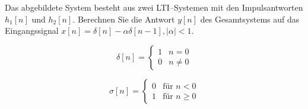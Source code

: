 \begin{uebsp}
\begin{Exercise}
Das abgebildete System besteht aus zwei LTI–Systemen mit den Impulsantworten
$h_1[n]$ und $h_2[n]$. Berechnen Sie die Antwort $y[n]$ des Gesamtsystems auf
das Eingangssignal $x[n] = \delta[n] - \alpha \delta[n - 1], |\alpha| < 1$.
\begin{center}
\end{center}
\end{Exercise}
\begin{Answer}
    \begin{definition}
        \[\delta[n]=\begin{cases}1 & n=0\\0 & n\neq 0\end{cases}\]
    \end{definition}
    \begin{definition}
        \[\sigma[n]=\begin{cases}0 & \text{für }n<0\\1& \text{für }n\geq 0\end{cases}\]
    \end{definition}


\end{Answer}
\end{uebsp}
